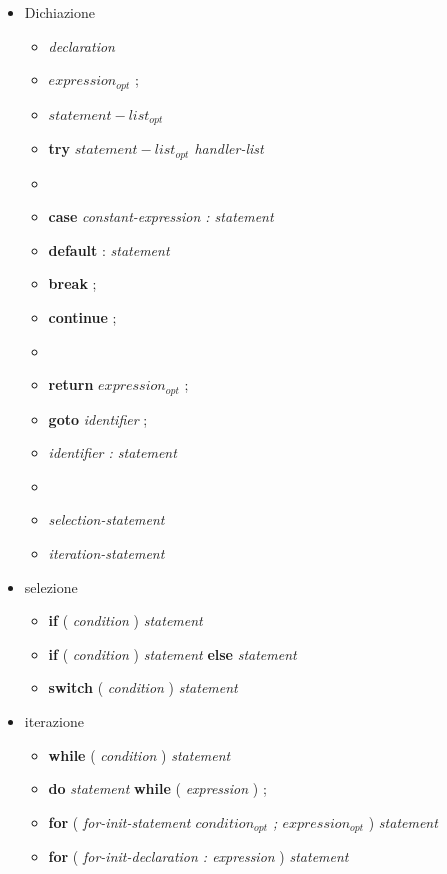 \documentclass[11pt,a4paper]{book}
\begin{document}
\begin{itemize}
	\item Dichiazione
	\begin{itemize}
		\item \textit{declaration}
		\item \textit{$expression_{opt}$} ;
		\item \textit{{$statement-list_{opt}$}}
		\item \textbf{try} \textit{{ $statement-list_{opt}$ } handler-list}
        \item[] 
		\item \textbf{case} \textit{constant-expression : statement}
		\item \textbf{default} : \textit{statement}
		\item \textbf{break} ;
		\item \textbf{continue} ;
        \item[]  
		\item \textbf{return} \textit{$expression_{opt}$} ;
		\item \textbf{goto} \textit{identifier} ;
		\item \textit{identifier : statement}
        \item[]  
		\item \textit{selection-statement}
		\item \textit{iteration-statement}
	\end{itemize}
	
	\item selezione
	\begin{itemize}
		\item \textbf{if} ( \textit{condition} ) \textit{statement}
		\item \textbf{if} ( \textit{condition} ) \textit{statement} \textbf{else} \textit{statement}
		\item \textbf{switch} ( \textit{condition} ) \textit{statement}
	\end{itemize}
	
	\item iterazione
	\begin{itemize}
		\item \textbf{while} ( \textit{condition} ) \textit{statement}
		\item \textbf{do} \textit{statement} \textbf{while} ( \textit{expression} ) ;
		\item \textbf{for} ( \textit{for-init-statement $condition_{opt}$ ; $expression_{opt}$} ) \textit{statement}
		\item \textbf{for} ( \textit{for-init-declaration : expression} ) \textit{statement}
	\end{itemize}
	

\end{itemize}
\end{document}
